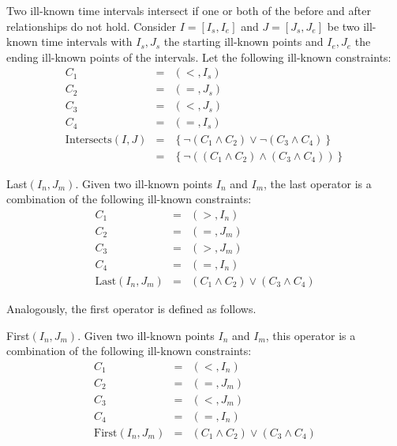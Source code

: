 \documentclass{llncs}
\begin{document}
\begin{definition}
 \label{def:ik-intersects}
Two ill-known time intervals intersect if one or both of the before and after relationships do not hold. Consider $I = \left[I_s, I_e \right]$ and $J = \left[J_s, J_e \right]$ be two ill-known time intervals with $I_s, J_s$ the starting ill-known points and $I_e, J_e$ the ending ill-known points of the intervals. Let the following ill-known constraints:
\begin{align}
 \label{eq:ik-intersects}
C_1 &=& \left(<, I_s \right)  \\
C_2 &=& \left(=, J_s \right) \\
C_3 &=& \left(<, J_s \right) \\
C_4 &=& \left(=, I_s \right) \\
\mbox{Intersects}\left(I, J\right) &=& \left \lbrace \neg \left(C_1 \wedge C_2 \right) \vee  \neg \left( C_3 \wedge C_4 \right)  \right \rbrace \\
\nonumber
&=& \left \lbrace \neg \left( \left(C_1 \wedge C_2 \right) \wedge \left(C_3 \wedge C_4 \right)  \right)\right \rbrace
\end{align}
\end{definition}


\begin{definition}
 \label{def:ik-last}
Last$\left(I_n, J_m \right)$. Given two ill-known points $I_n$ and $I_m$, the last operator is a combination of the following ill-known constraints:
\begin{align}
 \label{eq:il-last}
C_1 &=& \left(>, I_n \right) \\
C_2 &=& \left(=, J_m \right) \\
C_3 &=& \left(>, J_m \right) \\
C_4 &=& \left(=, I_n \right) \\
\mbox{Last}\left(I_n, J_m \right) &=& \left(C_1 \wedge C_2  \right) \vee \left(C_3 \wedge C_4 \right)
\end{align}
\end{definition}

Analogously, the first operator is defined as follows.
\begin{definition}
 \label{def:ik-first}
First$\left(I_n, J_m \right)$. Given two ill-known points $I_n$ and $I_m$, this operator is a combination of the following ill-known constraints:
\begin{align}
 \label{eq:ik-first}
C_1 &=& \left(<, I_n \right)\\
C_2 &=& \left(=, J_m \right)\\
C_3 &=& \left(<, J_m \right) \\
C_4 &=& \left(=, I_n \right) \\
\mbox{First}\left(I_n, J_m \right) &=& \left(C_1 \wedge C_2  \right) \vee \left(C_3 \wedge C_4 \right)
\end{align}
\end{definition}
\end{document}
